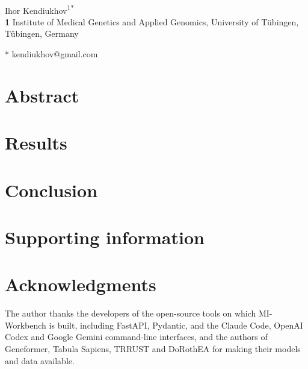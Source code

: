 \documentclass[10pt,letterpaper]{article}
\begin{document}
\vspace*{0.2in}

\begin{flushleft}
{\Large
\textbf{}
}
\newline
\\
Ihor Kendiukhov\textsuperscript{1*}
\\
\bigskip
\textbf{1} Institute of Medical Genetics and Applied Genomics, University of T\"ubingen, T\"ubingen, Germany
\\
\bigskip

* kendiukhov@gmail.com

\end{flushleft}

\section*{Abstract}


\linenumbers




\section*{Results}



\section*{Conclusion}

\section*{Supporting information}

\section*{Acknowledgments}
The author thanks the developers of the open-source tools on which MI-Workbench is built, including FastAPI, Pydantic, and the Claude Code, OpenAI Codex and Google Gemini command-line interfaces, and the authors of Geneformer, Tabula Sapiens, TRRUST and DoRothEA for making their models and data available.

\nolinenumbers


\end{document}
